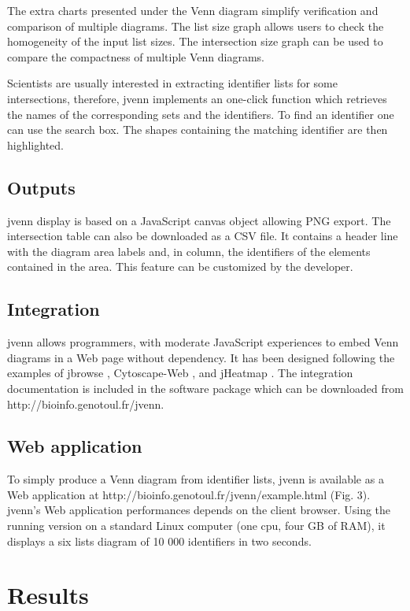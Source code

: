 \documentclass{bmcart}
\begin{document}
The extra charts presented under the Venn diagram simplify verification and
comparison of multiple diagrams. The list size graph allows users to check the
homogeneity of the input list sizes. The intersection size graph can be used to
compare the compactness of multiple Venn diagrams.

Scientists are usually interested in extracting identifier lists for some
intersections, therefore, jvenn implements an one-click function which retrieves
the names of the corresponding sets and the identifiers. To find an identifier
one can use the search box. The shapes containing the matching identifier are
then highlighted.

\subsection*{Outputs}

jvenn display is based on a JavaScript canvas object allowing PNG export. The 
intersection table can also be downloaded as a CSV file. It contains a header 
line with the diagram area labels and, in column, the identifiers of the
elements contained in the area. This feature can be customized by the
developer.

\subsection*{Integration}

jvenn allows programmers, with moderate JavaScript experiences to embed Venn
diagrams in a Web page without dependency. It has been designed following the
examples of jbrowse \cite{Westesson01032013}, Cytoscape-Web \cite{Lopes2010},
and jHeatmap \cite{DeuPons2014}.
The integration documentation is included in the software package which can be
downloaded from http://bioinfo.genotoul.fr/jvenn.

\subsection*{Web application}

To simply produce a Venn diagram from identifier lists, jvenn is 
available as a Web application at http://bioinfo.genotoul.fr/jvenn/example.html
(Fig. 3).
jvenn's Web application performances depends on the client browser. Using the running version
on a standard Linux computer (one cpu, four GB of RAM), it displays a six lists
diagram of 10 000 identifiers in two seconds.


\section*{Results}
\end{document}
